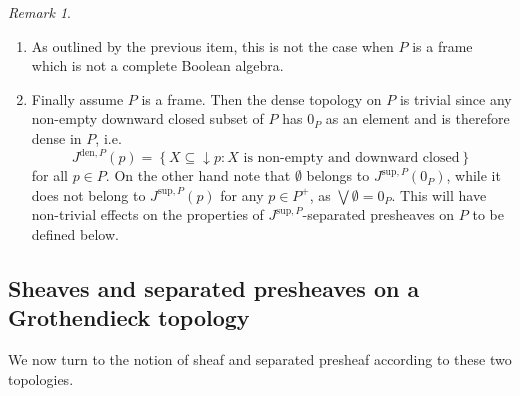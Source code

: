\documentclass[11pt]{amsart}
\theoremstyle{plain}
\theoremstyle{definition}
\theoremstyle{plain}
\theoremstyle{remark}
\newtheorem{remark}[theorem]{Remark}
\newcommand{\bp}[1]{\left\lbrace #1 \right\rbrace}
\newcommand{\0}{\mathsf{0}}
\renewcommand{\1}{\mathsf{1}}
\renewcommand{\2}{\mathsf{2}}
\theoremstyle{definition}
\begin{document}
\begin{remark}
\begin{enumerate}
\item
As outlined by the previous item, this is not the case when $P$ is a frame which is not a complete Boolean algebra.

\item
Finally assume $P$ is a frame. Then the dense topology on $P$ is trivial since any non-empty downward closed subset of $P$ has $0_P$ as an element and is therefore dense in $P$, i.e. 
\[
J^{\mathrm{den},P}(p)=\bp{X\subseteq \downarrow p: X \text{ is non-empty and downward closed}}
\]
for all $p\in P$. On the other hand note that $\emptyset$ belongs to $J^{\mathrm{sup},P}(0_P)$, while it does not belong to $J^{\mathrm{sup},P}(p)$ for any $p\in P^+$, as $\bigvee\emptyset=0_P$. This will have non-trivial effects on the properties of
 $J^{\mathrm{sup},P}$-separated presheaves on $P$ to be defined below. 

\end{enumerate}
\end{remark}


\subsection{Sheaves and separated presheaves on a Grothendieck topology}
We now turn to the notion of sheaf and separated presheaf according to these two topologies.
\end{document}
